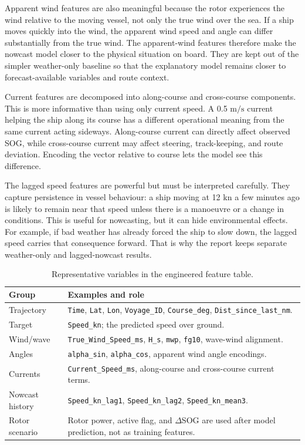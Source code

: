 \documentclass[10pt,a4paper]{article}
\newcommand{\kn}{\ensuremath{\mathrm{kn}}}
\newcommand{\ms}{\ensuremath{\mathrm{m/s}}}
\newcommand{\sog}{SOG}
\begin{document}
Apparent wind features are also meaningful because the rotor experiences the
wind relative to the moving vessel, not only the true wind over the sea. If a
ship moves quickly into the wind, the apparent wind speed and angle can differ
substantially from the true wind. The apparent-wind features therefore make the
nowcast model closer to the physical situation on board. They are kept out of
the simpler weather-only baseline so that the explanatory model remains closer
to forecast-available variables and route context.

Current features are decomposed into along-course and cross-course components.
This is more informative than using only current speed. A 0.5 \ms{} current
helping the ship along its course has a different operational meaning from the
same current acting sideways. Along-course current can directly affect observed
\sog{}, while cross-course current may affect steering, track-keeping, and
route deviation. Encoding the vector relative to course lets the model see this
difference.

The lagged speed features are powerful but must be interpreted carefully. They
capture persistence in vessel behaviour: a ship moving at 12 \kn{} a few minutes
ago is likely to remain near that speed unless there is a manoeuvre or a change
in conditions. This is useful for nowcasting, but it can hide environmental
effects. For example, if bad weather has already forced the ship to slow down,
the lagged speed carries that consequence forward. That is why the report keeps
separate weather-only and lagged-nowcast results.

\begin{table}[H]
\centering
\caption{Representative variables in the engineered feature table.}
\begin{tabularx}{\textwidth}{>{\raggedright\arraybackslash}p{}X}
\toprule
\textbf{Group} & \textbf{Examples and role} \\
\midrule
Trajectory & \texttt{Time}, \texttt{Lat}, \texttt{Lon}, \texttt{Voyage\_ID}, \texttt{Course\_deg}, \texttt{Dist\_since\_last\_nm}. \\
Target & \texttt{Speed\_kn}; the predicted speed over ground. \\
Wind/wave & \texttt{True\_Wind\_Speed\_ms}, \texttt{H\_s}, \texttt{mwp}, \texttt{fg10}, wave-wind alignment. \\
Angles & \texttt{alpha\_sin}, \texttt{alpha\_cos}, apparent wind angle encodings. \\
Currents & \texttt{Current\_Speed\_ms}, along-course and cross-course current terms. \\
Nowcast history & \texttt{Speed\_kn\_lag1}, \texttt{Speed\_kn\_lag2}, \texttt{Speed\_kn\_mean3}. \\
Rotor scenario & Rotor power, active flag, and $\Delta$\sog{} are used after model prediction, not as training features. \\
\bottomrule
\end{tabularx}
\end{table}
\end{document}
